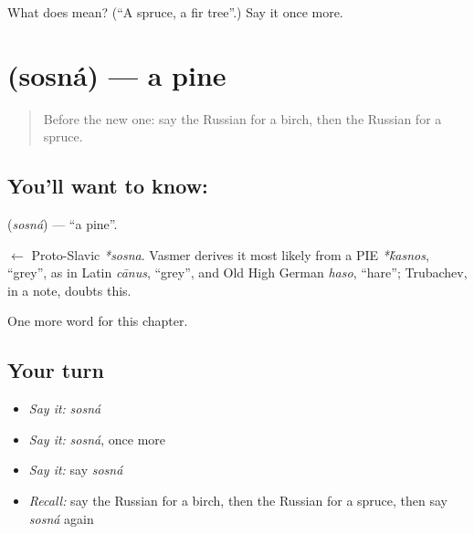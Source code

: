 \begin{tcolorbox}[breakable,colback=teal!4,colframe=teal!35!black,title={Before you move on}]
What does  mean? (\textquotedblleft{}A spruce, a fir tree\textquotedblright{}.) Say it once more.
\end{tcolorbox}
\section[\texorpdfstring{\ru{сосна} (sosná)}{сосна (sosná)}]{ (sosná) — a pine}

\label{lesson:RU-C224-sosna}



\begin{quote}
Before the new one: say the Russian for a birch, then the Russian for a spruce.
\end{quote}

\subsection*{You'll want to know: }
\textbf{} (\emph{sosná}) — \textquotedblleft{}a pine\textquotedblright{}.

\begin{cousinweb}
\textbf{} $\leftarrow$ Proto-Slavic \emph{*sosna}. Vasmer derives it most likely from a PIE \emph{*\'{k}asnos}, \textquotedblleft{}grey\textquotedblright{}, as in Latin \emph{cānus}, \textquotedblleft{}grey\textquotedblright{}, and Old High German \emph{haso}, \textquotedblleft{}hare\textquotedblright{}; Trubachev, in a note, doubts this.
\end{cousinweb}

\begin{grammarlens}[title={What you've built}]
One more word for this chapter.
\end{grammarlens}

\subsection*{Your turn}
\begin{itemize}
\raggedright
  \item \emph{Say it:} \emph{sosná}
  \item \emph{Say it:} \emph{sosná}, once more
  \item \emph{Say it:} say \emph{sosná}
  \item \emph{Recall:} say the Russian for a birch, then the Russian for a spruce, then say \emph{sosná} again
\end{itemize}

